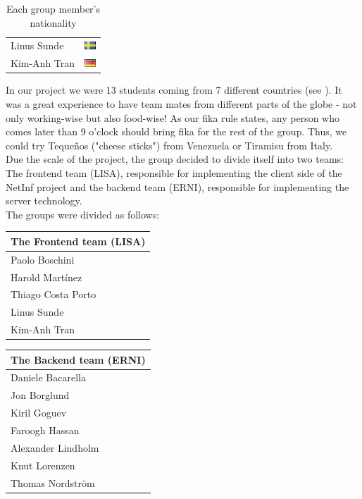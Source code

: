 \begin{table}
\begin{tabular}{|l|c|}
Linus Sunde & \includegraphics{graphics/se.png} \\
Kim-Anh Tran & \includegraphics{graphics/de.png} \\
\hline
\end{tabular}
\caption{Each group member's nationality}\label{tab:nationality}
\end{table}

In our project we were 13 students coming from 7 different countries (see ).
It was a great experience to have team mates from different parts of the globe - not
only working-wise but also food-wise! As our fika rule states, any person who comes later
than 9 o'clock should bring fika for the rest of the group. Thus, we could
try Teque\~{n}os ("cheese sticks") from Venezuela or Tiramisu from Italy.\\

Due the scale of the project, the group decided to divide itself into two teams: 
The frontend team (LISA), responsible for implementing the client side of the NetInf project and the backend team (ERNI), responsible for implementing the server technology.\\

The groups were divided as follows:

\begin{minipage}[b]{0.32\hsize}\centering
\begin{tabular}{l}
The Frontend team (LISA) \\\hline
Paolo Boschini\\
Harold Mart\'{i}nez\\
Thiago Costa Porto\\
Linus Sunde\\
Kim-Anh Tran
\end{tabular}
\end{minipage}
\hfill
\begin{minipage}[b]{0.32\hsize}\centering
\begin{tabular}{l}
The Backend team (ERNI) \\\hline
Daniele Bacarella\\
Jon Borglund\\
Kiril Goguev\\
Faroogh Hassan\\
Alexander Lindholm\\
Knut Lorenzen\\
Thomas Nordstr\"om
\end{tabular}
\end{minipage}

